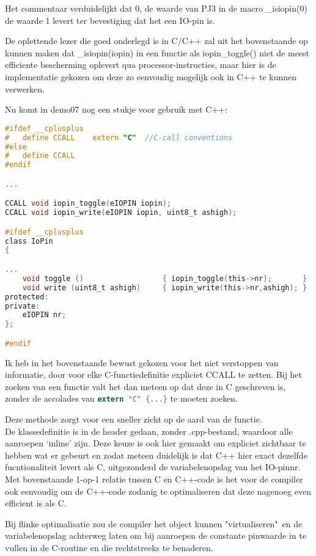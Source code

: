 \documentclass[a4paper, 11pt, fleqn, twoside]{scrartcl}%
\begin{document}
Het commentaar verduidelijkt dat 0, de waarde van PJ3 in de macro \_isiopin(0)
de waarde 1 levert ter bevestiging dat het een IO-pin is.

De oplettende lezer die goed onderlegd is in C/C++ zal uit het bovenstaande
op kunnen maken dat \_isiopin(iopin) in een functie als iopin\_toggle() niet
de meest efficiente bescherming oplevert qua processor-instructies, maar hier 
is de implementatie gekozen om deze zo eenvoudig mogelijk ook in C++ te kunnen 
verwerken.

Nu komt in demo07 nog een stukje voor gebruik met C++:
\begin{lstlisting}[language=C,backgroundcolor=\color{orange!10},framerule=0pt,columns=fixed]
#ifdef __cplusplus
#	define CCALL	extern "C"	//C-call conventions
#else
#	define CCALL
#endif

...

CCALL void iopin_toggle(eIOPIN iopin);
CCALL void iopin_write(eIOPIN iopin, uint8_t ashigh);

#ifdef __cplusplus
class IoPin
{

...
	void toggle ()					{ iopin_toggle(this->nr);		}
	void write (uint8_t ashigh)		{ iopin_write(this->nr,ashigh);	}
protected:
private:
	eIOPIN nr;
};

#endif
\end{lstlisting}

Ik heb in het bovenstaande bewust gekozen voor het niet verstoppen van 
informatie, door voor elke C-functiedefinitie expliciet CCALL te zetten.
Bij het zoeken van een functie valt het dan meteen op dat deze in C geschreven 
is, zonder de accolades van \lstinline[language=C]!extern "C" {...}! te
moeten zoeken.

Deze methode zorgt voor een sneller zicht op de aard van de functie.\\

De klassedefinitie is in de header gedaan, zonder .cpp-bestand, waardoor 
alle aanroepen `inline' zijn. Deze keuze is ook hier gemaakt om expliciet 
zichtbaar te hebben wat er gebeurt en zodat meteen duidelijk is dat C++ 
hier exact dezelfde fucntionaliteit levert als C, uitgezonderd de 
variabelenopslag van het IO-pinnr.\\

Met bovenstaande 1-op-1 relatie tussen C en C++-code is het voor de compiler 
ook eenvoudig om de C++-code zodanig te optimaliseren dat deze nagenoeg even 
efficient is als C.

Bij flinke optimalisatie zou de compiler het object kunnen "virtualiseren"\ 
en de variabelenopslag achterweg laten om bij aanroepen de constante pinwaarde 
in te vullen in de C-routine en die rechtstreeks te benaderen.
\end{document}
